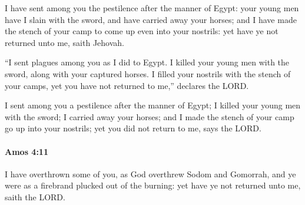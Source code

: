 			\begin{versebox}
					\item[BHS] 
					\item[LXX] 
					\item[ASV] I have sent among you the pestilence after the manner of Egypt: your young men have I slain with the sword, and have carried away your horses; and I have made the stench of your camp to come up even into your nostrils: yet have ye not returned unto me, saith Jehovah.
					\item[NIV] “I sent plagues among you as I did to Egypt. I killed your young men with the sword, along with your captured horses. I filled your nostrils with the stench of your camps, yet you have not returned to me,” declares the LORD.
					\item[NRSV] I sent among you a pestilence after the manner of Egypt; I killed your young men with the sword; I carried away your horses; and I made the stench of your camp go up into your nostrils; yet you did not return to me, says the LORD.
			\end{versebox}

		\paragraph{Amos 4:11} %
			\label{AMOS-4-11}

			I have overthrown some of you, as God overthrew Sodom and Gomorrah, and ye were as a firebrand plucked out of the burning: yet have ye not returned unto me, saith the LORD.

